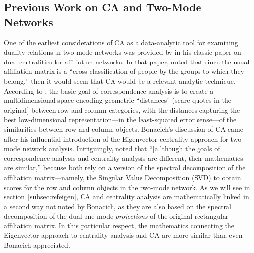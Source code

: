 \documentclass[a4paper,fleqn]{cas-sc}
\begin{document}
\subsection{Previous Work on CA and Two-Mode Networks}
One of the earliest considerations of CA as a data-analytic tool for examining duality relations in two-mode networks was provided by \citet[163-165]{bonacich1991simultaneous} in his classic paper on dual centralities for affiliation networks. In that paper, \citet{bonacich1991simultaneous} noted that since the usual affiliation matrix is a ``cross-classification of people by the groups to which they belong,'' then it would seem that CA would be a relevant analytic technique. According to \citet{bonacich1991simultaneous}, the basic goal of correspondence analysis is to create a multidimensional space encoding geometric ``distances'' (scare quotes in the original) between row and column categories, with the distances capturing the best low-dimensional representation---in the least-squared error sense---of the similarities between row and column objects.  Bonacich's discussion of CA came after his influential introduction of the Eigenvector centrality approach for two-mode network analysis. Intriguingly, \citet[163]{bonacich1991simultaneous} noted that ``[a]lthough the goals of correspondence analysis and centrality analysis are different, their mathematics are similar,'' because both rely on a version of the spectral decomposition of the affiliation matrix---namely, the Singular Value Decomposition (SVD) to obtain scores for the row and column objects in the two-mode network. As we will see in section~\ref{subsec:refeigen}, CA and centrality analysis are mathematically linked in a second way not noted by Bonacich, as they are also based on the spectral decomposition of the dual one-mode \textit{projections} of the original rectangular affiliation matrix. In this particular respect, the mathematics connecting the Eigenvector approach to centrality analysis and CA are more similar than even Bonacich appreciated. 
\end{document}
